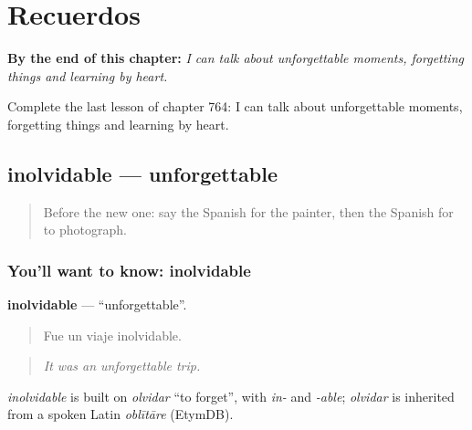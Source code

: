 
\chapter{Recuerdos}
\label{ch:es-recuerdos}

\begin{chapteropening}
\textbf{By the end of this chapter:} \emph{I can talk about unforgettable moments, forgetting things and learning by heart.}

Complete the last lesson of chapter 764: I can talk about unforgettable moments, forgetting things and learning by heart.
\end{chapteropening}

\section[inolvidable]{inolvidable — unforgettable}

\label{lesson:ES-C764-inolvidable}



\begin{quote}
Before the new one: say the Spanish for the painter, then the Spanish for to photograph.
\end{quote}

\subsection*{You'll want to know: inolvidable}
\textbf{inolvidable} — \textquotedblleft{}unforgettable\textquotedblright{}.

\begin{quote}
Fue un viaje inolvidable.
\end{quote}

\begin{quote}
\emph{It was an unforgettable trip.}
\end{quote}

\begin{cousinweb}
\emph{inolvidable} is built on \emph{olvidar} \textquotedblleft{}to forget\textquotedblright{}, with \emph{in-} and \emph{-able}; \emph{olvidar} is inherited from a spoken Latin \emph{oblītāre} (EtymDB).
\end{cousinweb}

